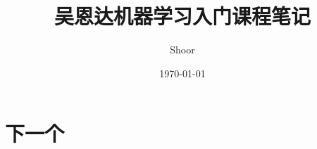 \documentclass{report}
\title{吴恩达机器学习入门课程笔记}
\author{Shoor}
\date{\today}
\begin{document}



\maketitle
\tableofcontents







\part{下一个}


\end{document}
